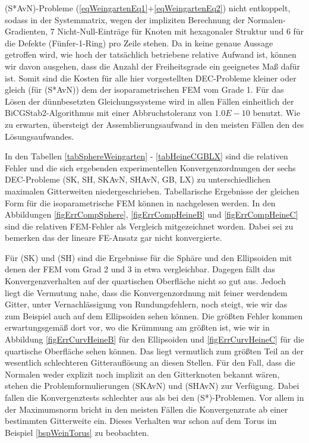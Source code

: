   (S*AvN)-Probleme (\eqref{eqWeingartenEq1}+\eqref{eqWeingartenEq2}) nicht entkoppelt, sodass in der
  Systemmatrix, wegen der impliziten Berechnung der Normalen-Gradienten, 7 Nicht-Null-Einträge für Knoten
  mit hexagonaler Struktur und 6 für die Defekte (Fünfer-1-Ring) pro Zeile stehen.
  Da in \cite{heine} keine genaue Aussage getroffen wird, wie hoch der tatsächlich betriebene relative Aufwand ist,
  können wir davon ausgehen, dass die Anzahl der Freiheitsgrade ein geeignetes Maß dafür ist.
  Somit sind die Kosten für alle hier vorgestellten DEC-Probleme kleiner oder gleich (für (S*AvN)) dem der
  isoparametrischen FEM vom Grade 1.
  Für das Lösen der dünnbesetzten Gleichungssysteme wird in allen Fällen einheitlich der
  BiCGStab2-Algorithmus mit einer Abbruchstoleranz von \( 1.0E-10 \) benutzt.
  Wie zu erwarten, übersteigt der Assemblierungsaufwand in den meisten Fällen den des Lösungsaufwandes.

  In den Tabellen \ref{tabSphereWeingarten} - \ref{tabHeineCGBLX} sind die relativen Fehler 
  und die sich ergebenden experimentellen Konvergenzordnungen der sechs
  DEC-Probleme (SK, SH, SKAvN, SHAvN, GB, LX) zu unterschiedlichen maximalen Gitterweiten niedergeschrieben.
  Tabellarische Ergebnisse der gleichen Form für die isoparametrische FEM können in \cite{heine} nachgelesen werden.
  In den Abbildungen \ref{figErrCompSphere}, \ref{figErrCompHeineB} und \ref{figErrCompHeineC} sind die
  relativen FEM-Fehler als Vergleich mitgezeichnet worden.
  Dabei sei zu bemerken das der lineare FE-Ansatz gar nicht konvergierte.

  Für (SK) und (SH) sind die Ergebnisse für die Sphäre und den Ellipsoiden mit denen der FEM vom Grad 2 und
  3 in etwa vergleichbar. 
  Dagegen fällt das Konvergenzverhalten auf der quartischen Oberfläche nicht so gut aus.
  Jedoch liegt die Vermutung nahe, dass die Konvergenzordnung mit feiner werdendem Gitter, unter
  Vernachlässigung von Rundungsfehlern, noch steigt, wie
  wir das zum Beispiel auch auf dem Ellipsoiden sehen können.
  Die größten Fehler kommen erwartungsgemäß dort vor, wo die Krümmung am größten ist, wie wir in Abbildung
  \ref{figErrCurvHeineB} für den Ellipsoiden und \ref{figErrCurvHeineC} für die quartische Oberfläche sehen
  können.
  Das liegt vermutlich zum größten Teil an der wesentlich schlechteren Gitterauflösung an diesen Stellen.
  Für den Fall, dass die Normalen weder explizit noch implizit an den Gitterknoten bekannt wären, stehen
  die Problemformulierungen (SKAvN) und (SHAvN) zur Verfügung.
  Dabei fallen die Konvergenztests schlechter aus als bei den (S*)-Problemen.
  Vor allem in der Maximumsnorm bricht in den meisten Fällen die Konvergenzrate ab einer bestimmten
  Gitterweite ein.
  Dieses Verhalten war schon auf dem Torus im Beispiel \ref{bspWeinTorus} zu beobachten.
  
